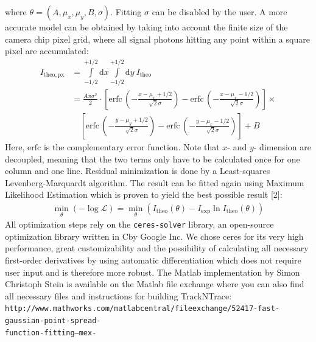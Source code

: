 \documentclass[11pt,onside]{report}
\newcommand{\D}[0]{\text{d}}
\numberwithin{equation}{chapter}
\def\CC{{C\nolinebreak[4]\hspace{-.05em}\raisebox{.4ex}{\tiny\bf ++}}}
\begin{document}
where $\theta = (A,\mu_x,\mu_y,B,\sigma)$. Fitting $\sigma$ can be disabled by the user. A more accurate model can be obtained by taking into account the finite size of the camera chip pixel grid, where all signal photons hitting any point within a square pixel are accumulated:
\begin{align*}
I_\mathrm{theo, px} &= \int\limits^{+1\slash 2}_{-1\slash 2} \D x \int\limits^{+1\slash 2}_{-1\slash 2} \D y\: I_\mathrm{theo} \\
&= \frac{A \pi \sigma^2}{2}\cdot \left[\mathrm{erfc}\,\left(-\frac{x-\mu_x+1\slash 2}{\sqrt{2} \sigma}\right) - \mathrm{erfc}\,\left(-\frac{x-\mu_x-1\slash 2}{\sqrt{2} \sigma}\right)\right] \times \\
&\quad \left[\mathrm{erfc}\,\left(-\frac{y-\mu_y+1\slash 2}{\sqrt{2} \sigma}\right) - \mathrm{erfc}\,\left(-\frac{y-\mu_x-1\slash 2}{\sqrt{2} \sigma}\right)\right] +B
\end{align*}
Here, $\mathrm{erfc}$ is the complementary error function. Note that $x$- and $y$- dimension are decoupled, meaning that the two terms only have to be calculated once for one column and one line. Residual minimization is done by a Least-squares Levenberg-Marquardt algorithm. The result can be fitted again using Maximum Likelihood Estimation which is proven to yield the best possible result [2]:
\begin{align*}
\min_\theta (-\log\mathcal{L}) = \min_\theta (I_\mathrm{theo}(\theta) - I_\mathrm{exp} \ln I_\mathrm{theo}(\theta))
\end{align*}
All optimization steps rely on the \texttt{ceres-solver} library, an open-source optimization library written in \CC by Google Inc. We chose ceres for its very high performance, great customizability and the possibility of calculating all necessary first-order derivatives by using automatic differentiation which does not require user input and is therefore more robust. The Matlab implementation by Simon Christoph Stein is available on the Matlab file exchange where you can also find all necessary files and instructions for building {TrackNTrace}:  \texttt{http://www.mathworks.com/matlabcentral/fileexchange/52417-fast-gaussian-point-spread-\\function-fitting--mex-}\\[10pt]
\end{document}

